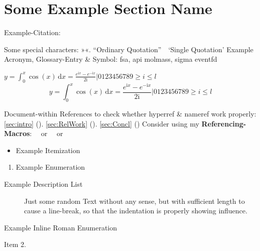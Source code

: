 



\section{Some Example Section Name}

Example-Citation:
\cite{DenKr_denkrement1_indeco}

\npi%
Some special characters:
»«.
\nl%
\nl
\enquote{Ordinary Quotation}\ \ \enquote*{Single Quotation}
\nl%
Example Acronym, Glossary-Entry \& Symbol:\nl
\gls{fsa}, \gls{api}\nl
\gls{molmass}, \gls{sigma}\nl
\gls{eventfd}

\np
\newcommand{\I}{\mathrm{i}}
$y = \int_0^x\cos(x)\,\mathrm{d}{x} = \frac{e^{\I x} - e^{-\I x}}{2\I} | 0123456789 \geq i \leqslant l$
\nl
\begin{equation}
y = \int_0^x\cos(x)\,\mathrm{d}{x} = \frac{e^{\I x} - e^{-\I x}}{2\I} | 0123456789 \geq i \leqslant l
\end{equation}

\npi%
Document-within References to check whether hyperref \& nameref work properly:\nl%
\ref{sec:intro} (). \ref{sec:RelWork}  (). \ref{sec:Concl} ()\nl%
Consider using my \textbf{Referencing-Macros}:\nl
{}\nl
\ \ or \nl
\ \ or 

\npi%
\begin{itemize}
\item%
	Example Itemization
\end{itemize}
\begin{enumerate}
\item%
	Example Enumeration
\end{enumerate}
\begin{description}
\item[Example Description List]%
	Just some random Text without any sense, but with sufficient length to cause a line-break, so that the indentation is properly showing influence.
\end{description}
\begin{enuminlrom}
\item%
	Example Inline Roman Enumeration
\item%
	Item 2.
\end{enuminlrom}

